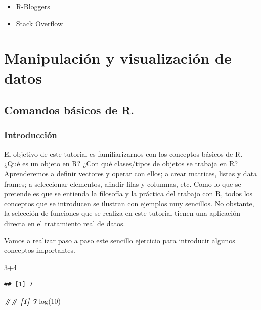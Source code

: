\documentclass[
]{book}
\newenvironment{Shaded}{\begin{snugshade}}{\end{snugshade}}
\newcommand{\DecValTok}[1]{\textcolor[rgb]{0.00,0.00,0.81}{#1}}
\newcommand{\DocumentationTok}[1]{\textcolor[rgb]{0.56,0.35,0.01}{\textbf{\textit{#1}}}}
\newcommand{\FunctionTok}[1]{\textcolor[rgb]{0.00,0.00,0.00}{#1}}
\newcommand{\NormalTok}[1]{#1}
\newcommand{\SpecialCharTok}[1]{\textcolor[rgb]{0.00,0.00,0.00}{#1}}
\begin{document}
\begin{itemize}
\item
  \href{https://www.r-bloggers.com/}{R-Bloggers}
\item
  \href{https://stackoverflow.com/}{Stack Overflow}
\end{itemize}

\hypertarget{manipulaciuxf3n-y-visualizaciuxf3n-de-datos}{%
\chapter{Manipulación y visualización de datos}\label{manipulaciuxf3n-y-visualizaciuxf3n-de-datos}}

\hypertarget{comandos-buxe1sicos-de-r.}{%
\section{Comandos básicos de R.}\label{comandos-buxe1sicos-de-r.}}

\hypertarget{introducciuxf3n}{%
\subsection{Introducción}\label{introducciuxf3n}}

El objetivo de este tutorial es familiarizarnos con los conceptos básicos de R. ¿Qué es un objeto en R? ¿Con qué clases/tipos de objetos se trabaja en R?
Aprenderemos a definir vectores y operar con ellos; a crear matrices, listas y data frames; a seleccionar elementos, añadir filas y columnas, etc. Como lo que se pretende es que se entienda la filosofía y la práctica del trabajo con R, todos los conceptos que se introducen se ilustran con ejemplos muy sencillos. No obstante, la selección de funciones que se realiza en este tutorial tienen una aplicación directa en el tratamiento real de datos.

Vamos a realizar paso a paso este sencillo ejercicio para introducir algunos conceptos importantes.

\begin{Shaded}
\begin{Highlighting}[]
\DecValTok{3}\SpecialCharTok{+}\DecValTok{4}
\end{Highlighting}
\end{Shaded}

\begin{verbatim}
## [1] 7
\end{verbatim}

\begin{Shaded}
\begin{Highlighting}[]
\DocumentationTok{\#\# [1] 7}
\FunctionTok{log}\NormalTok{(}\DecValTok{10}\NormalTok{)}
\end{Highlighting}
\end{Shaded}
\end{document}
